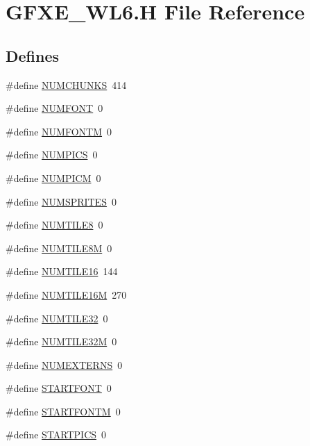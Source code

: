 \hypertarget{GFXE__WL6_8H}{
\section{GFXE\_\-WL6.H File Reference}
\label{GFXE__WL6_8H}
}
\subsection*{Defines}
\begin{DoxyCompactItemize}
\item 
\#define \hyperlink{GFXE__WL6_8H_a06c8b188cc3cdd25a5451beeefddfa66}{NUMCHUNKS}~414
\item 
\#define \hyperlink{GFXE__WL6_8H_a7686ac8ed1dbf71ebee2b4711dae0edd}{NUMFONT}~0
\item 
\#define \hyperlink{GFXE__WL6_8H_afd7a523b060f425fd737a94c044892ac}{NUMFONTM}~0
\item 
\#define \hyperlink{GFXE__WL6_8H_a437727f0f1480aff6a1437f8881e2241}{NUMPICS}~0
\item 
\#define \hyperlink{GFXE__WL6_8H_a2eb878497ab6b2a4f80015a218f38c8f}{NUMPICM}~0
\item 
\#define \hyperlink{GFXE__WL6_8H_ac7e5f97c96cc0101c6f998c7010813a3}{NUMSPRITES}~0
\item 
\#define \hyperlink{GFXE__WL6_8H_a1ad83311a1b6300dcac06636eb1d03b4}{NUMTILE8}~0
\item 
\#define \hyperlink{GFXE__WL6_8H_a99d75e9d203bae79464f2ecd3fd31b8d}{NUMTILE8M}~0
\item 
\#define \hyperlink{GFXE__WL6_8H_a64d23288f15517babe845b31bebdf108}{NUMTILE16}~144
\item 
\#define \hyperlink{GFXE__WL6_8H_a80bd5aa78c52471ba88d9d15baeb5e44}{NUMTILE16M}~270
\item 
\#define \hyperlink{GFXE__WL6_8H_a63d2fe64d989433ecd39d601070bfe04}{NUMTILE32}~0
\item 
\#define \hyperlink{GFXE__WL6_8H_ac85fdf79a513ee60e10cbb347ba5129f}{NUMTILE32M}~0
\item 
\#define \hyperlink{GFXE__WL6_8H_abb86554baf24d8863e54bf20d68120b5}{NUMEXTERNS}~0
\item 
\#define \hyperlink{GFXE__WL6_8H_a91e546d8307de206a3822f7ea9064cb2}{STARTFONT}~0
\item 
\#define \hyperlink{GFXE__WL6_8H_a8e97342cc14d7aed1d20b6ff859f22ef}{STARTFONTM}~0
\item 
\#define \hyperlink{GFXE__WL6_8H_aaf17bc60cff0a0236cafed9026641531}{STARTPICS}~0
\item 

\end{DoxyCompactItemize}
